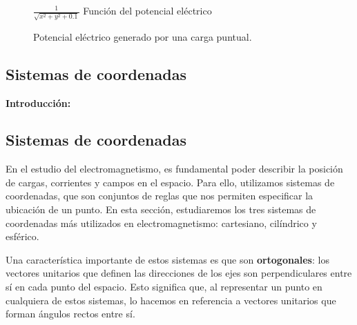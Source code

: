 \documentclass{article}
\begin{document}
  
\begin{figure}[H] %
\centering
{}
$\frac{1}{\sqrt{x^2 + y^2 + 0.1}}$ Función del potencial eléctrico
\caption{Potencial eléctrico generado por una carga puntual.}
\end{figure}
 



\newpage
\subsection{Sistemas de coordenadas}

\textbf{Introducción:}

\subsection{Sistemas de coordenadas}

En el estudio del electromagnetismo, es fundamental poder describir la posición de cargas, corrientes y campos en el espacio. Para ello, utilizamos sistemas de coordenadas, que son conjuntos de reglas que nos permiten especificar la ubicación de un punto. En esta sección, estudiaremos los tres sistemas de coordenadas más utilizados en electromagnetismo: cartesiano, cilíndrico y esférico.

Una característica importante de estos sistemas es que son \textbf{ortogonales}: los vectores unitarios que definen las direcciones de los ejes son perpendiculares entre sí en cada punto del espacio. Esto significa que, al representar un punto en cualquiera de estos sistemas, lo hacemos en referencia a vectores unitarios que forman ángulos rectos entre sí. 
\end{document}
